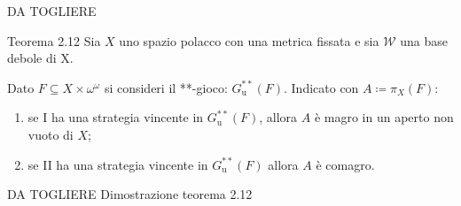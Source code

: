 \documentclass[babel]{beamer}
\renewcommand{\href}[2]{#2}
\begin{document}
\begin{frame}[label={sec:org857017c}]{DA TOGLIERE}
\begin{alertblock}{Teorema 2.12}
Sia \(X\) uno spazio polacco con una metrica fissata e sia \(\mathcal{W}\) una base debole di X.

Dato \(F \subseteq X\times \omega^{\omega}\) si consideri il \href{../../../../../../../org/roam/20250513111844-gioco_di_banach_mazur.org}{**-gioco}: \(G^{**}_{\text{u}}(F)\). Indicato con \(A\coloneqq \pi_{X}(F)\):
\begin{enumerate}
\item se I ha una \href{../../../../../../../org/roam/20250513171520-giochi_di_gale_stewart.org}{strategia} \href{../../../../../../../org/roam/20250513171520-giochi_di_gale_stewart.org}{vincente} in \(G^{**}_{\text{u}}(F)\), allora \(A\) è magro in un aperto non vuoto di \(X\);
\item se II ha una \href{../../../../../../../org/roam/20250513171520-giochi_di_gale_stewart.org}{strategia} \href{../../../../../../../org/roam/20250513171520-giochi_di_gale_stewart.org}{vincente} in \(G^{**}_{\text{u}}(F)\) allora \(A\) è comagro.
\end{enumerate}
\end{alertblock}
\end{frame}
\begin{frame}[label={sec:org223aa91}]{DA TOGLIERE}
Dimostrazione teorema 2.12
\end{frame}
\end{document}
